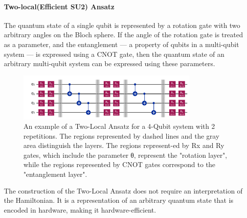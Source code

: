 \documentclass[pdflatex,sn-mathphys-num]{sn-jnl}%
\theoremstyle{thmstyleone}%
\theoremstyle{thmstyletwo}%
\theoremstyle{thmstylethree}%
\begin{document}
\paragraph{Two-local(Efficient SU2) Ansatz} \leavevmode \newline
The quantum state of a single qubit is represented by a rotation gate with two arbitrary angles on the Bloch sphere. 
If the angle of the rotation gate is treated as a parameter, and the entanglement — a property of qubits in a multi-qubit system — is expressed using a CNOT gate, 
then the quantum state of an arbitrary multi-qubit system can be expressed using these parameters.
\begin{figure}[H]
\centering
\includegraphics[width=0.8\textwidth]{fig/twolocal.png}
\caption{An example of a Two-Local Ansatz for a 4-Qubit system with 2 repetitions. The regions represented by dashed lines and the gray area distinguish the layers. The regions represent-ed by Rx and Ry gates, which include the parameter θ, represent the "rotation layer", while the regions represented by CNOT gates correspond to the "entanglement layer".}\label{Fig.3}
\end{figure}
The construction of the Two-Local Ansatz does not require an interpretation of the Hamiltonian. It is a representation of an arbitrary quantum state that is encoded in hardware, making it hardware-efficient.
\end{document}
